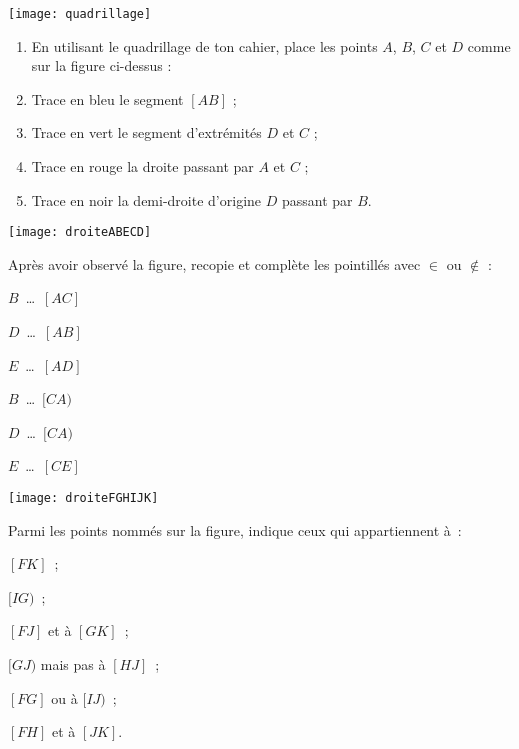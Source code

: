 

\begin{exercice}
 \begin{center} \texttt{[image: quadrillage]} \end{center}
 \begin{enumerate}
  \item En utilisant le quadrillage de ton cahier, place les points $A$, $B$, $C$ et $D$ comme sur la figure ci-dessus :
  \item Trace en bleu le segment $[AB]$ ;
  \item Trace en vert le segment d'extrémités $D$ et $C$ ;
  \item Trace en rouge la droite passant par $A$ et $C$ ;
  \item Trace en noir la demi-droite d'origine $D$ passant par $B$.
  \end{enumerate}
 \end{exercice}


\begin{exercice}
 \begin{center} \texttt{[image: droiteABECD]} \end{center}
 Après avoir observé la figure, recopie et complète les pointillés avec $\in$ ou $\notin$ :
    \begin{colenumerate}{3}
     \item $B$ \ldots $[AC]$
     \item $D$ \ldots $[AB]$
     \item $E$ \ldots $[AD]$
     \item $B$ \ldots $[CA)$
     \item $D$ \ldots $[CA)$
     \item $E$ \ldots $[CE]$
     \end{colenumerate}
\end{exercice}


\begin{exercice}[À trouver]
 \begin{center} \texttt{[image: droiteFGHIJK]}  \end{center}
 Parmi les points nommés sur la figure, indique ceux qui appartiennent à :
    \begin{colenumerate}{2}
     \item $[FK]$ ;
     \item $[IG)$ ;
     \item $[FJ]$ et à $[GK]$ ;
     \item $[GJ)$ mais pas à $[HJ]$ ;
     \item $[FG]$ ou à $[IJ)$ ;
     \item $[FH]$ et à $[JK]$.
     \end{colenumerate}
\end{exercice}


